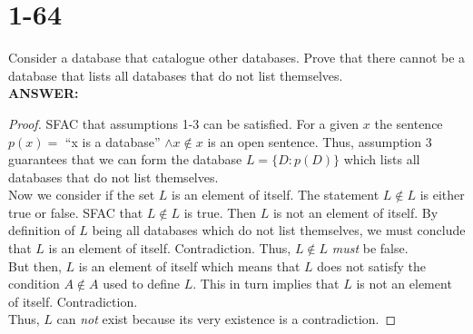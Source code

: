 \documentclass{article}
\begin{document}
\section{1-64}
Consider a database that catalogue other databases.  Prove that there cannot be
a database that lists all databases that do not list themselves. \\
\textbf{ANSWER:}
\begin{proof}
    SFAC that assumptions 1-3 can be satisfied. For a given $x$ the sentence
    $p(x) =$ ``x is a database'' $\land x \not\in x$ is an open sentence. Thus,
    assumption 3 guarantees that we can form the database $L = \{ D : p(D) \}$
    which lists all databases that do not list themselves. \\

    Now we consider if the set $L$ is an element of itself.  The statement $L
    \not\in L$ is either true or false. SFAC that $L \not\in L$ is true.  Then
    $L$ is not an element of itself.  By definition of $L$ being all databases
    which do not list themselves, we must conclude that $L$ is an element of
    itself. Contradiction.  Thus, $L \not\in L$ \textit{must} be false. \\

    But then, $L$ is an element of itself which means that $L$ does not satisfy
    the condition $A \not\in A$ used to define $L$.  This in turn implies that
    $L$ is not an element of itself.  Contradiction. \\

    Thus, $L$ can \textit{not} exist because its very existence is a
    contradiction.
\end{proof}
\end{document}
